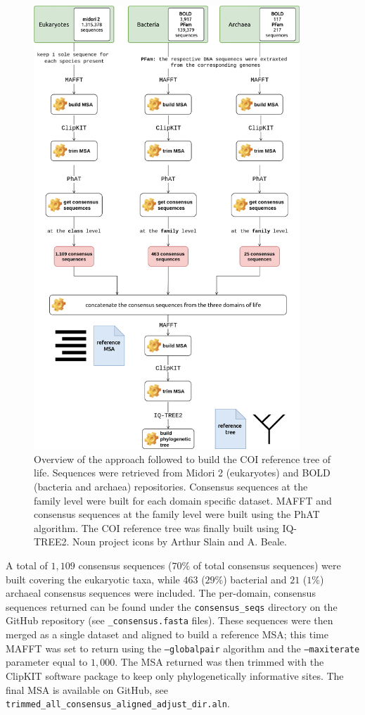    \begin{figure}
      \centering
      \includegraphics[width=100mm]{figures/darn_methodology.jpg}
      \caption[Building the COI reference tree of life]{
         Overview of the approach followed to build the COI reference tree of life. 
         Sequences were retrieved from Midori 2 (eukaryotes) and BOLD (bacteria and archaea) repositories. 
         Consensus sequences at the family level were built for each domain specific dataset. 
         MAFFT and consensus sequences at the family level were built using the PhAT algorithm. 
         The COI reference tree was finally built using IQ-TREE2. 
         Noun project icons by Arthur Slain and A. Beale.
      }
      \label{fig:darn-build-tree}
   \end{figure}


   A total of $1,109$ consensus sequences ($70\%$ of total consensus sequences) were built covering the eukaryotic taxa, 
   while $463$ ($29\%$) bacterial and $21$ ($1\%$) archaeal consensus sequences were included. 
   The per-domain, consensus sequences returned can be found under the \texttt{consensus\_seqs} directory on 
   the GitHub repository 
   (see \texttt{\_consensus.fasta} files). 
   These sequences were then merged as a single dataset and aligned to build a reference MSA; 
   this time MAFFT was set to return using the \texttt{--globalpair} algorithm and the \texttt{--maxiterate} parameter 
   equal to $1,000$. 
   The MSA returned was then trimmed with the ClipKIT software package \citep{steenwyk2020clipkit} to keep only phylogenetically informative sites. 
   The final MSA is available on GitHub, see \texttt{trimmed\_all\_consensus\_aligned\_adjust\_dir.aln}.

